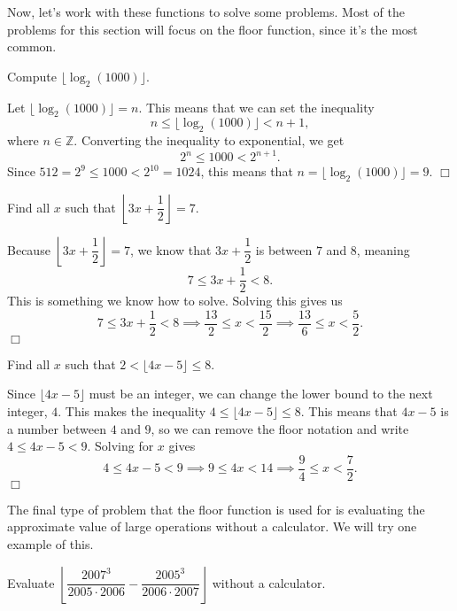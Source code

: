 \documentclass[../book.tex]{subfiles}
\begin{document}
Now, let's work with these functions to solve some problems.  Most of the problems for this section will focus on the floor function, since it's the most common.
\begin{example}
Compute $\lfloor{\log_2(1000)\rfloor}$.
\end{example}
\begin{solution}
Let $\lfloor{\log_2(1000)\rfloor}=n$.  This means that we can set the inequality $$n\leq\lfloor{\log_2(1000)\rfloor}<n+1,$$ where $n\in\mathbb{Z}$.  Converting the inequality to exponential, we get $$2^n\leq 1000<2^{n+1}.$$  Since $512=2^9\leq 1000<2^{10}=1024$, this means that $n=\lfloor{\log_2(1000)\rfloor}=9$. $\Box$
\end{solution}
\begin{example}
Find all $x$ such that $\left\lfloor{3x+\dfrac{1}{2}}\right\rfloor=7$.
\end{example}
\begin{solution}
Because $\left\lfloor{3x+\dfrac{1}{2}}\right\rfloor=7$, we know that $3x+\dfrac{1}{2}$ is between $7$ and $8$, meaning $$7\leq 3x+\dfrac{1}{2}<8.$$  This is something we know how to solve.  Solving this gives us $$7\leq 3x+\dfrac{1}{2}<8 \implies \dfrac{13}{2}\leq x<\dfrac{15}{2} \implies \dfrac{13}{6}\leq x<\dfrac{5}{2}.$$ $\Box$
\end{solution}
\begin{example}
Find all $x$ such that $2<\lfloor{4x-5}\rfloor\leq 8$.
\end{example}
\begin{solution}
Since $\lfloor{4x-5}\rfloor$ must be an integer, we can change the lower bound to the next integer, $4$.  This makes the inequality $4\leq \lfloor{4x-5}\rfloor\leq 8$.  This means that $4x-5$ is a number between $4$ and $9$, so we can remove the floor notation and write $4\leq 4x-5<9$.  Solving for $x$ gives $$4\leq 4x-5<9 \implies 9\leq 4x<14 \implies \dfrac{9}{4}\leq x<\dfrac{7}{2}.$$ $\Box$
\end{solution}
The final type of problem that the floor function is used for is evaluating the approximate value of large operations without a calculator.  We will try one example of this.
\begin{example}
Evaluate $\left\lfloor{\dfrac{2007^3}{2005 \cdot 2006}-\dfrac{2005^3}{2006\cdot 2007}}\right\rfloor$ without a calculator.
\end{example}
\end{document}
